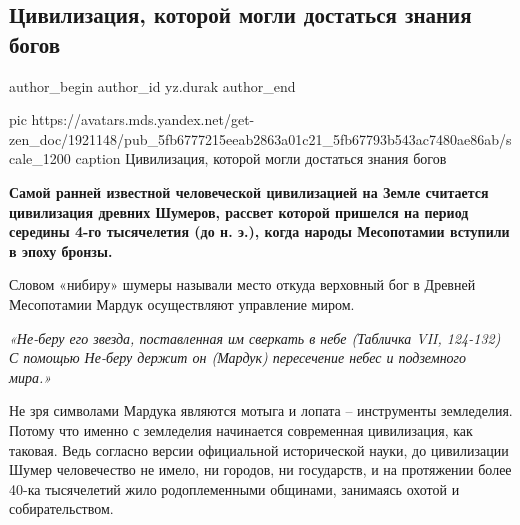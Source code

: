  
 
 
 
 
 
\subsection{Цивилизация, которой могли достаться знания богов}
\label{sec:20_11_2020.sites.ru.zen_yandex.yz.durak.1.shumery_civilizacia}
\ifcmt
	author_begin
   author_id yz.durak
	author_end
\fi


\ifcmt
pic https://avatars.mds.yandex.net/get-zen_doc/1921148/pub_5fb6777215eeab2863a01c21_5fb67793b543ac7480ae86ab/scale_1200
caption Цивилизация, которой могли достаться знания богов
\fi

\textbf{Самой ранней известной человеческой цивилизацией на Земле считается цивилизация
древних Шумеров, рассвет которой пришелся на период середины 4-го тысячелетия
(до н. э.), когда народы Месопотамии вступили в эпоху бронзы.}

Словом «нибиру» шумеры называли место откуда верховный бог в Древней
Месопотамии Мардук осуществляют управление миром.

\begin{leftbar}
	\begingroup
		\em «Не-беру его звезда, поставленная им сверкать в небе (Табличка VII,
				124-132) С помощью Не-беру держит он (Мардук) пересечение небес и
				подземного мира.»
	\endgroup
\end{leftbar}

Не зря символами Мардука являются мотыга и лопата – инструменты земледелия.
Потому что именно с земледелия начинается современная цивилизация, как таковая.
Ведь согласно версии официальной исторической науки, до цивилизации Шумер
человечество не имело, ни городов, ни государств, и на протяжении более 40-ка
тысячелетий жило родоплеменными общинами, занимаясь охотой и собирательством.

